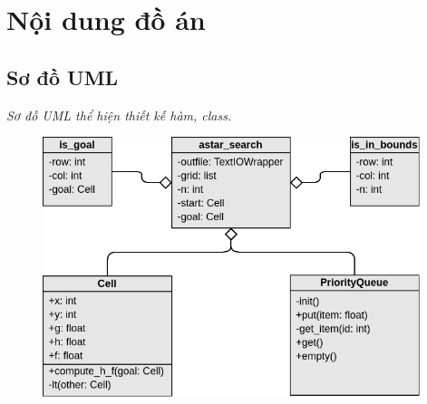 \section{Nội dung đồ án}
\subsection{Sơ đồ UML}
\textit{Sơ đồ UML thể hiện thiết kế hàm, class.}
\begin{figure}[htb]
\centering
\includegraphics[width=0.98\textwidth]{uml.png} %
\end{figure}

